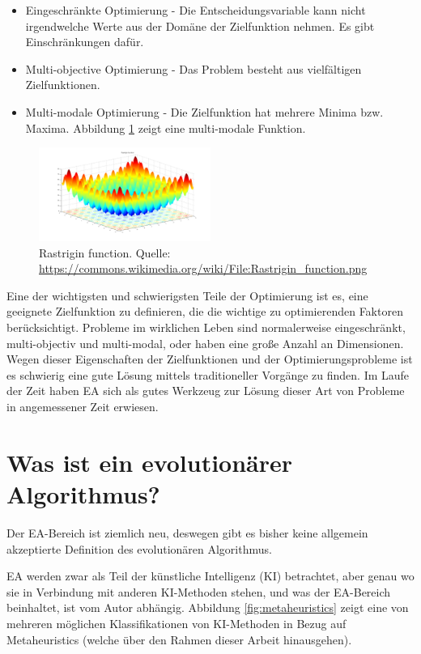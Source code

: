 \documentclass[twoside,twocolumn]{article}
\begin{document}
\begin{itemize}
\item{Eingeschränkte Optimierung - Die Entscheidungsvariable kann nicht irgendwelche Werte aus der Domäne der Zielfunktion nehmen. Es gibt Einschränkungen dafür.}
\item{Multi-objective Optimierung - Das Problem besteht aus vielfältigen Zielfunktionen.}
\item{Multi-modale Optimierung - Die Zielfunktion hat mehrere Minima bzw. Maxima. Abbildung \ref{fig:rastrigin} zeigt eine multi-modale Funktion.}
\end{itemize}

\begin{figure}
\caption{Rastrigin function. Quelle: \url{https://commons.wikimedia.org/wiki/File:Rastrigin_function.png}}
\label{fig:rastrigin}
\centering
\includegraphics[width=0.5\textwidth]{images/rastrigin_function.png}
\end{figure}

Eine der wichtigsten und schwierigsten Teile der Optimierung ist es, eine geeignete Zielfunktion zu definieren, die die wichtige zu optimierenden Faktoren berücksichtigt.
Probleme im wirklichen Leben sind normalerweise eingeschränkt, multi-objectiv und multi-modal, oder haben eine große Anzahl an Dimensionen. Wegen dieser Eigenschaften der Zielfunktionen und der Optimierungsprobleme ist es schwierig eine gute Lösung mittels traditioneller Vorgänge zu finden. Im Laufe der Zeit haben EA sich als gutes Werkzeug zur Lösung dieser Art von Probleme in angemessener Zeit erwiesen.


\section{Was ist ein evolutionärer Algorithmus?}
Der EA-Bereich ist ziemlich neu, deswegen gibt es bisher keine allgemein akzeptierte Definition des evolutionären Algorithmus.\par
EA werden zwar als Teil der künstliche Intelligenz (KI) betrachtet, aber genau wo sie in Verbindung mit anderen KI-Methoden stehen, und was der EA-Bereich beinhaltet, ist vom Autor abhängig. Abbildung \ref{fig:metaheuristics} zeigt eine von mehreren möglichen Klassifikationen von KI-Methoden in Bezug auf Metaheuristics (welche über den Rahmen dieser Arbeit hinausgehen).
\end{document}
